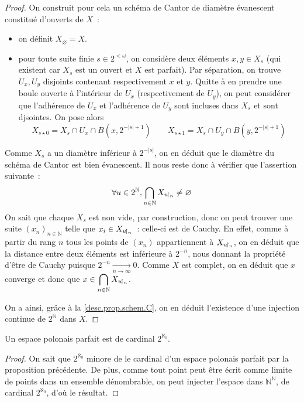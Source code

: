 \begin{proof}
  On construit pour cela un schéma de Cantor de diamètre évanescent constitué
  d'ouverts de $X$~:
  \begin{itemize}
  \item on définit $X_\varnothing = X$.
  \item pour toute suite finie $s\in 2^{<\omega}$, on considère deux éléments
    $x,y\in X_s$ (qui existent car $X_s$ est un ouvert et $X$ est parfait). Par
    séparation, on trouve $U_x,U_y$ disjoints contenant respectivement $x$ et
    $y$. Quitte à en prendre une boule ouverte à l'intérieur de $U_x$
    (respectivement de $U_y$), on peut considérer que l'adhérence de
    $U_x$ et l'adhérence de $U_y$ sont incluses dans $X_s$ et sont djsointes.
    On pose alors
    \[X_{s\star 0} = X_s\cap U_x \cap B(x,2^{-|s|+1})\qquad
    X_{s\star 1} = X_s\cap U_y \cap B(y,2^{-|s|+1})\]
  \end{itemize}
  Comme $X_s$ a un diamètre inférieur à $2^{-|s|}$, on en déduit que le diamètre
  du schéma de Cantor est bien évanescent. Il nous reste donc à vérifier que
  l'assertion suivante~:
  \[\forall u\in 2^\mathbb N,\bigcap_{n \in \mathbb N}X_{u\!\upharpoonright_{n}}
  \neq\varnothing\]
  On sait que chaque $X_s$ est non vide, par construction, donc on peut trouver
  une suite $(x_n)_{n\in\mathbb N}$ telle que $x_i\in X_{u\!\upharpoonright_{n}}$~: celle-ci
  est de Cauchy. En effet, comme à partir du rang $n$ tous les points de
  $(x_n)$ appartiennent à $X_{u\!\upharpoonright_{n}}$, on en déduit que la distance entre
  deux éléments est inférieure à $2^{-n}$, nous donnant la propriété d'être de
  Cauchy puisque $2^{-n} \xrightarrow[n\to\infty]{} 0$. Comme $X$ est complet,
  on en déduit que $x$ converge et donc que
  $\displaystyle x\in\bigcap_{n\in\mathbb N} X_{u\!\upharpoonright_{n}}$.

  On a ainsi, grâce à la \cref{desc.prop.schem.C}, on en déduit l'existence
  d'une injection continue de $2^\mathbb N$ dans $X$.
\end{proof}

\begin{corollary}
  Un espace polonais parfait est de cardinal $2^{\aleph_0}$.
\end{corollary}

\begin{proof}
  On sait que $2^{\aleph_0}$ minore de le cardinal d'un espace polonais parfait
  par la proposition précédente. De plus, comme tout point peut être écrit
  comme limite de points dans un ensemble dénombrable, on peut injecter l'espace
  dans $\mathbb N^\mathbb N$, de cardinal $2^{\aleph_0}$, d'où le résultat.
\end{proof}

